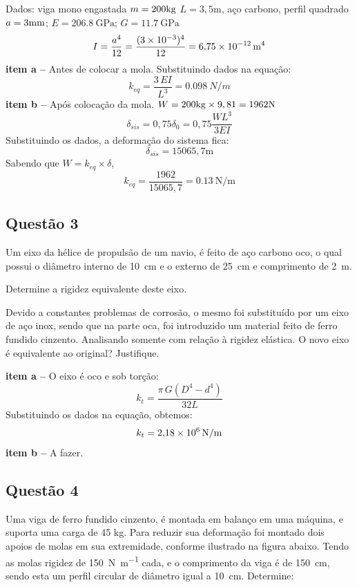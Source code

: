 \resol

Dados: viga mono engastada $m=200 \kg$ $L=3,5 \mathrm{m}$, aço carbono, perfil
quadrado $a=3 \mm$; $E=\SI{206,8}{\giga\pascal}$;  $G=\SI{11,7}{\giga\pascal}$
\[
    I=\frac{a^4}{12} = \frac{(3\times 10^{-3})^4}{12}=\SI{6,75d-12}{m^4}
\]
\textbf{item a --} Antes de colocar a mola.
Substituindo dados na equação:
\[
k_{eq}=\frac{3\, E I}{L^3}=\SI{0,098}{N /m}
\]
\textbf{item b --} Após colocação da mola.
$W=200\kg \times 9,81 = 1962\mathrm{N}$
\[
    \delta_{sis}=0,75\delta_{0}=0,75 \frac{W L^3}{3E I}
\]
Substituindo os dados, a deformação do sistema fica:
\[
    \delta_{sis}=15065,7\mathrm{m}
\]
Sabendo que $W=k_{eq}\times \delta$,
\[
    k_{eq}=\frac{1962}{15065,7}=\SI{0,13}{\newton\per\meter}
\]

\subsection{Questão 3}
Um eixo da hélice de propulsão de um navio, é feito de aço carbono oco, o qual
possui o diâmetro interno de \SI{10}{cm} e o externo de \SI{25}{cm} e
comprimento de \SI{2}{m}.
\begin{enumalpha}
    \item Determine a rigidez equivalente deste eixo.
    \item Devido a constantes problemas de corrosão, o mesmo foi substituído por
um eixo de aço inox, sendo que na parte oca, foi introduzido um material feito
de ferro fundido cinzento. Analisando somente com
relação à rigidez elástica. O novo eixo é equivalente ao original? Justifique.
\end{enumalpha}

\resol

\textbf{item a --} O eixo é oco e sob torção:
\begin{equation}\label{eq:rigidez_eixo_oco}
k_t=\frac{\pi\,G \left( D^{4}-d^{4} \right)  }{32L}
\end{equation}
Substituindo os dados na equação, obtemos:
\[
k_t=\SI{2,18d6}{\newton\per\meter}
\]
\textbf{item b --} A fazer.

\subsection{Questão 4}
Uma viga de ferro fundido cinzento, é montada em balanço em uma máquina, e
suporta uma carga de 45 kg. Para reduzir sua deformação foi montado dois apoios
de molas em sua extremidade, conforme ilustrado na figura abaixo. Tendo as molas
rigidez de \SI{150}{\newton\per\meter} cada, e o comprimento da viga é de
\SI{150}{cm}, sendo esta um perfil circular de diâmetro igual a \SI{10}{cm}.
Determine:

